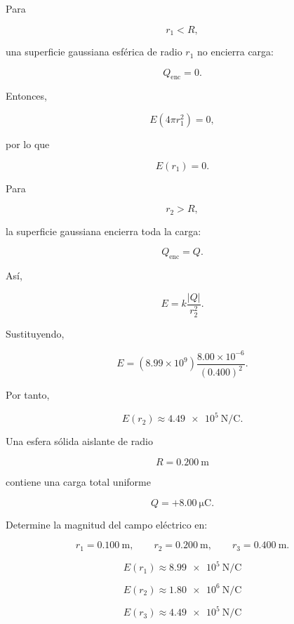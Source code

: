 \begin{explicacion}

Para

\[
r_1<R,
\]

una superficie gaussiana esférica de radio \(r_1\) no encierra carga:

\[
Q_{\text{enc}}=0.
\]

Entonces,

\[
E(4\pi r_1^2)=0,
\]

por lo que

\[
\boxed{E(r_1)=0}.
\]

Para

\[
r_2>R,
\]

la superficie gaussiana encierra toda la carga:

\[
Q_{\text{enc}}=Q.
\]

Así,

\[
E=k\frac{|Q|}{r_2^2}.
\]

Sustituyendo,

\[
E=(8.99\times10^9)
\frac{8.00\times10^{-6}}{(0.400)^2}.
\]

Por tanto,

\[
\boxed{E(r_2)\approx\SI{4.49e5}{\newton\per\coulomb}}.
\]

\end{explicacion}


\begin{ejercicio}

Una esfera sólida aislante de radio

\[
R=\SI{0.200}{\metre}
\]

contiene una carga total uniforme

\[
Q=+\SI{8.00}{\micro\coulomb}.
\]

Determine la magnitud del campo eléctrico en:

\[
r_1=\SI{0.100}{\metre},\qquad
r_2=\SI{0.200}{\metre},\qquad
r_3=\SI{0.400}{\metre}.
\]

\end{ejercicio}

\begin{respuesta}

\[
\boxed{E(r_1)\approx\SI{8.99e5}{\newton\per\coulomb}}
\]

\[
\boxed{E(r_2)\approx\SI{1.80e6}{\newton\per\coulomb}}
\]

\[
\boxed{E(r_3)\approx\SI{4.49e5}{\newton\per\coulomb}}
\]

\end{respuesta}

